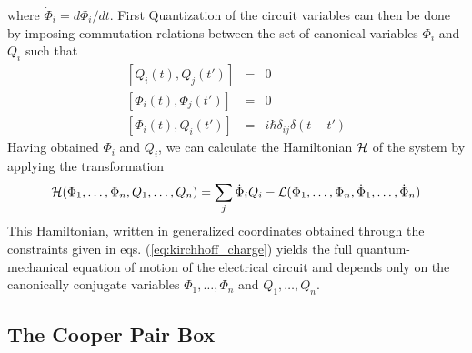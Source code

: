 %
where $\dot{\Phi}_i=d\Phi_i/dt$. First Quantization of the circuit variables can then be done by imposing commutation relations between the set of canonical variables $\Phi_i$ and $Q_i$ such that
%
\begin{eqnarray}
\left[Q_i(t),Q_j(t')\right] & = & 0 \\
\left[\Phi_i(t),\Phi_j(t') \right] & = & 0 \\
\left[\Phi_i(t),Q_i(t')\right] & = & i\hbar\delta_{ij}\delta(t-t') \label{eq:quantization_commutation_relations}
\end{eqnarray}
%
Having obtained $\Phi_i$ and $Q_i$, we can calculate the Hamiltonian $\begin{mathcal}H\end{mathcal}$ of the system by applying the transformation
%
\begin{equation}
\begin{mathcal}H\end{mathcal}(\Phi_1,\hdots,\Phi_n,Q_1,\hdots,Q_n) = \sum\limits_j \dot{\Phi}_i Q_i - \begin{mathcal}L\end{mathcal}(\Phi_1,\hdots,\Phi_n,\dot{\Phi}_1,\hdots,\dot{\Phi}_n) \label{eq:l_to_h}
\end{equation}
%
This Hamiltonian, written in generalized coordinates obtained through the constraints given in eqs. (\ref{eq:kirchhoff_charge}) yields the full quantum-mechanical equation of motion of the electrical circuit and depends only on the canonically conjugate variables $\Phi_{1},\hdots,\Phi_n$ and $Q_1,\hdots,Q_n$.

\subsection{The Cooper Pair Box}

